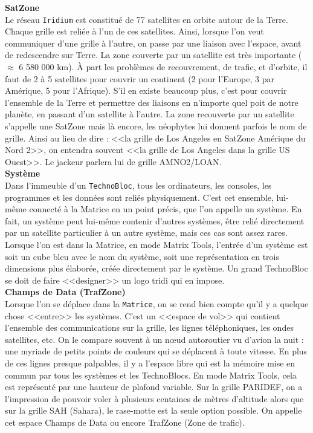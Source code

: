 \documentclass[11pt,twoside,a4paper]{article}
\begin{document}
\begin{multicols*}{2}
\textbf{SatZone}~\\
Le r{\'e}seau \texttt{Iridium} est constitu{\'e} de 77 satellites en orbite autour de la Terre. Chaque grille est reli{\'e}e {\`a} l'un de ces satellites. Ainsi, lorsque l'on veut communiquer d'une grille {\`a} l'autre, on passe par une liaison avec l'espace, avant de redescendre sur Terre. La zone couverte par un satellite est tr{\`e}s importante ($\approx$ 6 580 000 km). {\`A} part les probl{\`e}mes de recouvrement, de trafic, et d'orbite, il faut de 2 {\`a} 5 satellites pour couvrir un continent (2 pour l'Europe, 3 par Am{\'e}rique, 5 pour l'Afrique). S'il en existe beaucoup plus, c'est pour couvrir l'ensemble de la Terre et permettre des liaisons en n'importe quel poit de notre plan{\`e}te, en passant d'un satellite {\`a} l'autre. La zone recouverte par un satellite s'appelle une SatZone mais l{\`a} encore, les n{\'e}ophytes lui donnent parfois le nom de grille. Ainsi au lieu de dire : <<la grille de Los Angeles en SatZone Am{\'e}rique du Nord 2>>, on entendra souvent <<la grille de Los Angeles dans la grille US Ouest>>. Le jackeur parlera lui de grille AMNO2/LOAN. ~\\

\textbf{Syst{\`e}me}~\\
Dans l'immeuble d'un \texttt{TechnoBloc}, tous les ordinateurs, les consoles, les programmes et les donn{\'e}es sont reli{\'e}s physiquement. C'est cet ensemble, lui-m{\^e}me connect{\'e} {\`a} la Matrice en un point pr{\'e}cis, que l'on appelle un syst{\`e}me. En fait, un syst{\`e}me peut lui-m{\^e}me contenir d'autres syst{\`e}mes, {\^e}tre reli{\'e} directement par un satellite particulier {\`a} un autre syst{\`e}me, mais ces cas sont assez rares. Lorsque l'on est dans la Matrice, en mode Matrix Tools, l'entr{\'e}e d'un syst{\`e}me est soit un cube bleu avec le nom du syst{\`e}me, soit une repr{\'e}sentation en trois dimensions plus {\'e}labor{\'e}e, cr{\'e}{\'e}e directement par le syst{\`e}me. Un grand TechnoBloc se doit de faire <<designer>> un logo tridi qui en impose. ~\\

\textbf{Champs de Data (TrafZone)}~\\
Lorsque l'on se d{\'e}place dans la \texttt{Matrice}, on se rend bien compte qu'il y a quelque chose <<entre>> les syst{\`e}mes. C'est un <<espace de vol>> qui contient l'ensemble des communications sur la grille, les lignes t{\'e}l{\'e}phoniques, les ondes satellites, etc. On le compare souvent {\`a} un n\oe ud autoroutier vu d'avion la nuit : une myriade de petits points de couleurs qui se d{\'e}placent {\`a} toute vitesse. En plus de ces lignes presque palpables, il y a l'espace libre qui est la m{\'e}moire mise en commun par tous les syst{\`e}mes et les TechnoBlocs. En mode Matrix Tools, cela est repr{\'e}sent{\'e} par une hauteur de plafond variable. Sur la grille PARIDEF, on a l'impression de pouvoir voler {\`a} plusieurs centaines de m{\`e}tres d'altitude alors que sur la grille SAH (Sahara), le rase-motte est la seule option possible. On appelle cet espace Champs de Data ou encore TrafZone (Zone de trafic). ~\\


\end{multicols*}
\end{document}
